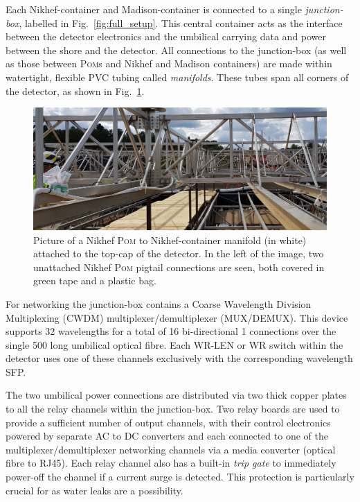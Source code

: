Each Nikhef-container and Madison-container is connected to a single \emph{junction-box}, labelled
in Fig.~\ref{fig:full_setup}. This central container acts as the interface between the detector
electronics and the umbilical carrying data and power between the shore and the detector. All
connections to the junction-box (as well as those between \textsc{Pom}s and Nikhef and Madison
containers) are made within watertight, flexible PVC tubing called \emph{manifolds}. These tubes
span all corners of the \chipsfive detector, as shown in Fig.~\ref{fig:manifold}.

\begin{figure} %
    \includegraphics[width=\textwidth]{diagrams/5-daq/manifold.pdf}
    \caption[manifold short]
    {Picture of a Nikhef \textsc{Pom} to Nikhef-container manifold (in white) attached to the
        top-cap of the \chipsfive detector. In the left of the image, two unattached Nikhef
        \textsc{Pom} pigtail connections are seen, both covered in green tape and a plastic bag.}
    \label{fig:manifold}
\end{figure}

For networking the junction-box contains a Coarse Wavelength Division Multiplexing (CWDM)
multiplexer/demultiplexer (MUX/DEMUX). This device supports 32 wavelengths for a total of 16
bi-directional \unit{1}{} connections over the single \unit{500}{} long umbilical
optical fibre. Each WR-LEN or WR switch within the detector uses one of these channels exclusively
with the corresponding wavelength SFP.

The two umbilical power connections are distributed via two thick copper plates to all the relay
channels within the junction-box. Two relay boards are used to provide a sufficient number of
output channels, with their control electronics powered by separate AC to DC converters and each
connected to one of the multiplexer/demultiplexer networking channels via a media converter
(optical fibre to RJ45). Each relay channel also has a built-in \emph{trip gate} to immediately
power-off the channel if a current surge is detected. This protection is particularly crucial for
\chipsfive as water leaks are a possibility.


